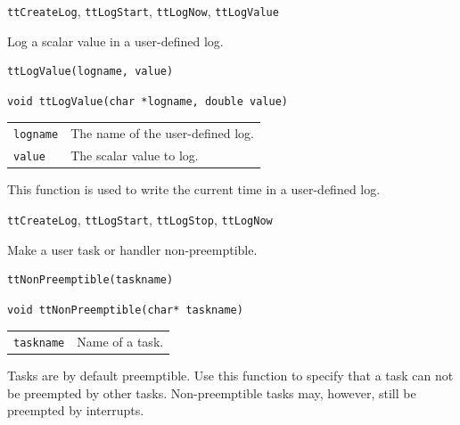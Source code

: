 \documentclass[final,twoside]{rapport}
\begin{document}
\seealso
{\tt ttCreateLog}, {\tt ttLogStart}, {\tt ttLogNow}, {\tt ttLogValue} 



\purpose
Log a scalar value in a user-defined log.

\Msyntax
\begin{verbatim}
ttLogValue(logname, value)
\end{verbatim}

\Csyntax
\begin{verbatim}
void ttLogValue(char *logname, double value) 
\end{verbatim}

\args
\begin{tabularx}{\hsize}{l>{\raggedright\arraybackslash}X}
  {\tt logname} & The name of the user-defined log. \\
  {\tt value} & The scalar value to log. \\
\end{tabularx}

\descr This function is used to write the current time in a user-defined log.

\seealso
{\tt ttCreateLog}, {\tt ttLogStart}, {\tt ttLogStop}, {\tt ttLogNow} 



\purpose
Make a user task or handler non-preemptible.

\Msyntax
\begin{verbatim}
ttNonPreemptible(taskname)
\end{verbatim}

\Csyntax
\begin{verbatim}
void ttNonPreemptible(char* taskname)
\end{verbatim}

\args
\begin{tabularx}{\hsize}{l>{\raggedright\arraybackslash}X}
  {\tt taskname} & Name of a task. \\
\end{tabularx}

\descr Tasks are by default preemptible. Use this function to specify
that a task can not be preempted by other tasks. Non-preemptible tasks
may, however, still be preempted by interrupts.

\end{document}
